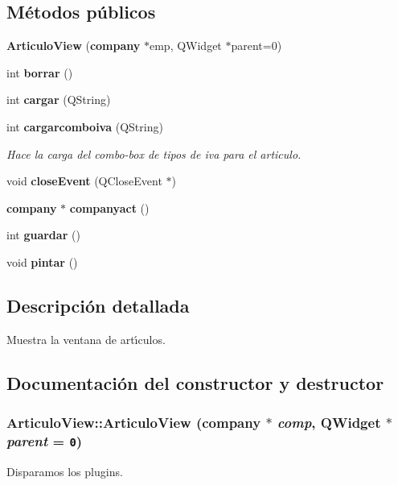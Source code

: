 \subsection*{M\'{e}todos p\'{u}blicos}
\begin{CompactItemize}
\item 
{\bf Articulo\-View} ({\bf company} $\ast$emp, QWidget $\ast$parent=0)
\item 
int {\bf borrar} ()
\item 
int {\bf cargar} (QString)
\item 
int {\bf cargarcomboiva} (QString)\label{classArticuloView_a3}

\begin{CompactList}\small\item\em Hace la carga del combo-box de tipos de iva para el articulo. \item\end{CompactList}\item 
void {\bf close\-Event} (QClose\-Event $\ast$)\label{classArticuloView_a4}

\item 
{\bf company} $\ast$ {\bf companyact} ()\label{classArticuloView_a5}

\item 
int {\bf guardar} ()
\item 
void {\bf pintar} ()
\end{CompactItemize}


\subsection{Descripci\'{o}n detallada}
Muestra la ventana de art\'{\i}culos. 



\subsection{Documentaci\'{o}n del constructor y destructor}
\subsubsection{\setlength{\rightskip}{0pt plus 5cm}Articulo\-View::Articulo\-View ({\bf company} $\ast$ {\em comp}, QWidget $\ast$ {\em parent} = {\tt 0})}\label{classArticuloView_a0}


Disparamos los plugins. 

